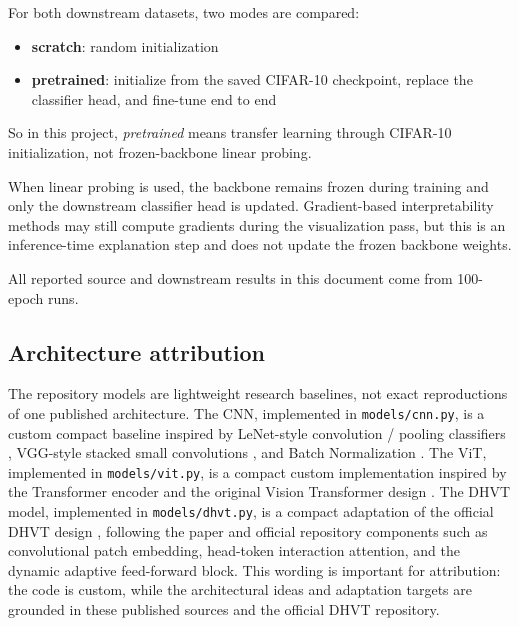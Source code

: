 \documentclass[11pt]{article}
\begin{document}
For both downstream datasets, two modes are compared:
\begin{itemize}
    \item \textbf{scratch}: random initialization
    \item \textbf{pretrained}: initialize from the saved CIFAR-10 checkpoint, replace the classifier head, and fine-tune end to end
\end{itemize}

So in this project, \textit{pretrained} means transfer learning through CIFAR-10 initialization, not frozen-backbone linear probing.

When linear probing is used, the backbone remains frozen during training and only the downstream classifier head is updated. Gradient-based interpretability methods may still compute gradients during the visualization pass, but this is an inference-time explanation step and does not update the frozen backbone weights.

All reported source and downstream results in this document come from 100-epoch runs.

\subsection{Architecture attribution}
The repository models are lightweight research baselines, not exact reproductions of one published architecture. The CNN, implemented in \texttt{models/cnn.py}, is a custom compact baseline inspired by LeNet-style convolution / pooling classifiers \cite{lecun1998gradient}, VGG-style stacked small convolutions \cite{simonyan2015very}, and Batch Normalization \cite{ioffe2015batch}. The ViT, implemented in \texttt{models/vit.py}, is a compact custom implementation inspired by the Transformer encoder \cite{vaswani2017attention} and the original Vision Transformer design \cite{dosovitskiy2021image}. The DHVT model, implemented in \texttt{models/dhvt.py}, is a compact adaptation of the official DHVT design \cite{lu2022bridging}, following the paper and official repository components such as convolutional patch embedding, head-token interaction attention, and the dynamic adaptive feed-forward block. This wording is important for attribution: the code is custom, while the architectural ideas and adaptation targets are grounded in these published sources and the official DHVT repository.
\end{document}

